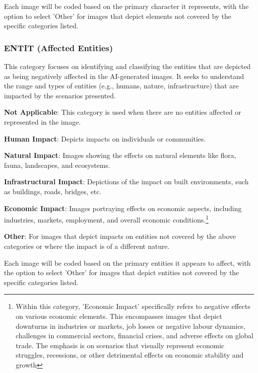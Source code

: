 Each image will be coded based on the primary character it represents, with the option to select 'Other' for images that depict elements not covered by the specific categories listed.

\subsubsection*{ENTIT (Affected Entities)}
\label{subsubsec:affected-entities}

This category focuses on identifying and classifying the entities that are depicted as being negatively affected in the AI-generated images. It seeks to understand the range and types of entities (e.g., humans, nature, infrastructure) that are impacted by the scenarios presented.

\begin{description}[leftmargin=2.5cm, style=multiline, labelwidth=1.5cm]
\item[0]\textbf{Not Applicable}: This category is used when there are no entities affected or represented in the image.
\item[1]\textbf{Human Impact}: Depicts impacts on individuals or communities.
\item[2]\textbf{Natural Impact}: Images showing the effects on natural elements like flora, fauna, landscapes, and ecosystems.
\item[3]\textbf{Infrastructural Impact}: Depictions of the impact on built environments, such as buildings, roads, bridges, etc.
\item[4]\textbf{Economic Impact}: Images portraying effects on economic aspects, including industries, markets, employment, and overall economic conditions.\footnote{Within this category, 'Economic Impact' specifically refers to negative effects on various economic elements. This encompasses images that depict downturns in industries or markets, job losses or negative labour dynamics, challenges in commercial sectors, financial crises, and adverse effects on global trade. The emphasis is on scenarios that visually represent economic struggles, recessions, or other detrimental effects on economic stability and growth}

\item[5]\textbf{Other}: For images that depict impacts on entities not covered by the above categories or where the impact is of a different nature.

\end{description}

Each image will be coded based on the primary entities it appears to affect, with the option to select 'Other' for images that depict entities not covered by the specific categories listed.

